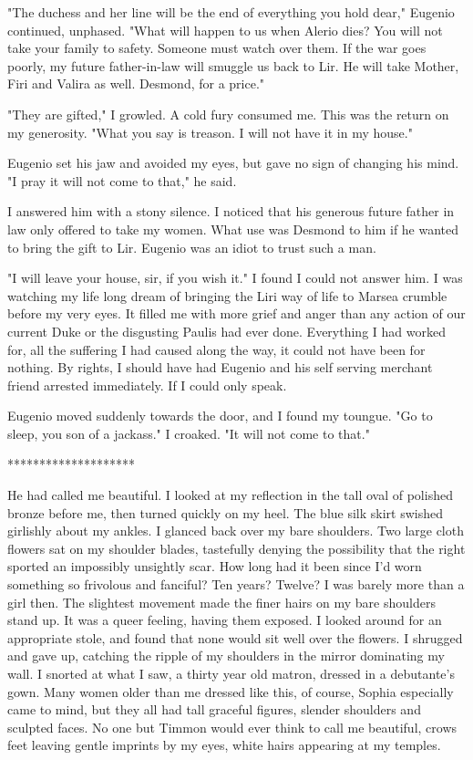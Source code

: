 \documentclass{article}
\begin{document}
"The duchess and her line will be the end of everything you hold dear," Eugenio continued, unphased. "What will happen to us when Alerio dies? You will not take your family to safety. Someone must watch over them. If the war goes poorly, my future father-in-law will smuggle us back to Lir. He will take Mother, Firi and Valira as well. Desmond, for a price."

"They are gifted," I growled. A cold fury consumed me. This was the return on my generosity. "What you say is treason. I will not have it in my house."

Eugenio set his jaw and avoided my eyes, but gave no sign of changing his mind. "I pray it will not come to that," he said.

I answered him with a stony silence. I noticed that his generous future father in law only offered to take my women. What use was Desmond to him if he wanted to bring the gift to Lir. Eugenio was an idiot to trust such a man.

"I will leave your house, sir, if you wish it." I found I could not answer him. I was watching my life long dream of bringing the Liri way of life to Marsea crumble before my very eyes. It filled me with more grief and anger than any action of our current Duke or the disgusting Paulis had ever done. Everything I had worked for, all the suffering I had caused along the way, it could not have been for nothing. By rights, I should have had Eugenio and his self serving merchant friend arrested immediately. If I could only speak.

Eugenio moved suddenly towards the door, and I found my toungue. "Go to sleep, you son of a jackass." I croaked. "It will not come to that."

********************

He had called me beautiful. I looked at my reflection in the tall oval of polished bronze before me, then turned quickly on my heel. The blue silk skirt swished girlishly about my ankles. I glanced back over my bare shoulders. Two large cloth flowers sat on my shoulder blades, tastefully denying the possibility that the right sported an impossibly unsightly scar. How long had it been since I'd worn something so frivolous and fanciful? Ten years? Twelve? I was barely more than a girl then. The slightest movement made the finer hairs on my bare shoulders stand up. It was a queer feeling, having them exposed. I looked around for an appropriate stole, and found that none would sit well over the flowers. I shrugged and gave up, catching the ripple of my shoulders in the mirror dominating my wall. I snorted at what I saw, a thirty year old matron, dressed in a debutante's gown. Many women older than me dressed like this, of course, Sophia especially came to mind, but they all had tall graceful figures, slender shoulders and sculpted faces. No one but Timmon would ever think to call me beautiful, crows feet leaving gentle imprints by my eyes, white hairs appearing at my temples.
\end{document}
